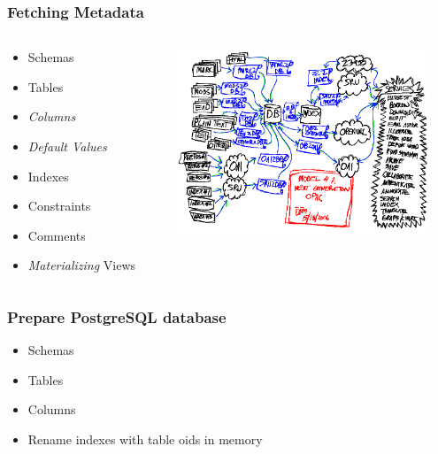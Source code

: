 \documentclass{beamer}
\begin{document}
\begin{frame}
  \frametitle{Fetching Metadata}

  \vfill

  \begin{columns}
    \begin{column}{0.4\textwidth}
      \begin{itemize}
      \item Schemas
      \item Tables
      \item \textit{Columns}
      \item \textit{Default Values}
      \item Indexes
      \item Constraints
      \item Comments 
      \item \textit{Materializing} Views 
      \end{itemize}
    \end{column}

    \begin{column}{.6\textwidth}
      \begin{center}
        \includegraphics[height=15em]{metadata.png}
      \end{center}
    \end{column}
  \end{columns}
\end{frame}

\begin{frame}
  \frametitle{Prepare PostgreSQL database}

  \vfill

  \begin{itemize}
  \item Schemas
  \item Tables
  \item Columns
  \item Rename indexes with table oids in memory
  \end{itemize}
\end{frame}
\end{document}
